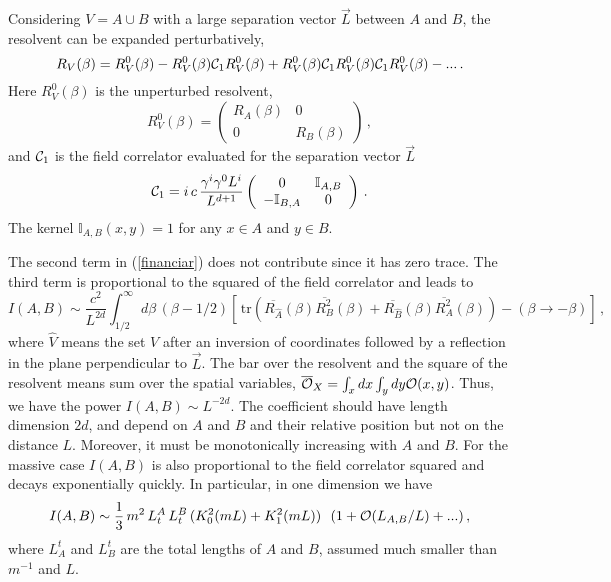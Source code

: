 \documentclass[a4paper]{article}
\begin{document}
Considering $V=A\cup B$ with a large separation vector $\vec{L}$ between $A$ and $B$, the resolvent can be expanded perturbatively,
\begin{equation}
R_V(\beta)=R_V^0(\beta)-R_V^0(\beta){\cal C}_1 R_V^0(\beta)+R_V^0(\beta){\cal C}_1 R_V^0(\beta){\cal C}_1 R_V^0(\beta)-...\,.
\label{financiar1}
\end{equation}
Here $R_V^0(\beta)$ is the unperturbed resolvent, 
\begin{equation}
R_V^0(\beta)=\left(\begin{array}{cc}
R_A(\beta) & 0 \\
0 & R_B(\beta) 
 \end{array}
\right)\,,
\end{equation}
and ${\cal C}_1$ is the field correlator evaluated for the separation vector $\vec{L}$ 
\begin{equation}
{\cal C}_1=i\,c \,\frac{\gamma^i \gamma^0 L^i}{L^{d+1}} \left(\begin{array}{cc}
0& {\mathbb I}_{A,B} \\
-{\mathbb I}_{B,A} & 0 
 \end{array}
\right)\,.
\end{equation}
The kernel ${\mathbb I}_{A,B}(x,y)=1$ for any $x\in A$ and $y\in B$. 




The second term in (\ref{financiar}) does not contribute since it has zero trace. The third term is proportional to the squared of the field correlator and leads to 
\begin{equation}
I(A,B)\sim \frac{c^2}{L^{2 d}}\int^\infty_{1/2} d\beta\,\left(\beta-1/2\right)\left[\, \textrm{tr} \left(  \overline{R_{\hat{A}}}(\beta) \overline{R_B^2}(\beta) +  \overline{R_{\hat{B}}}(\beta)  \overline{R_A^2}(\beta)\right)            -\left(\beta\rightarrow -\beta\right)\right]\,,\label{inn}
\end{equation}
where $\hat{V}$ means the set $V$ after an inversion of coordinates followed by a reflection in the plane perpendicular to $\vec{L}$. The bar over the resolvent and the square of the resolvent means sum over the spatial variables, $\overline{{\cal O}}_X=\int_x dx\int_y dy {\cal O}(x,y)$.
Thus, we have the power $I(A,B)\sim L^{-2d}$. The coefficient should have length dimension $2d$, and depend on $A$ and $B$ and their relative position but not on the distance $L$. Moreover, it must be monotonically increasing with $A$ and $B$. For the massive case $I(A,B)$ is also proportional to the field correlator squared and decays exponentially quickly. In particular, in one dimension we have \cite{futuro}
\begin{equation}
I(A,B)\sim \frac{1}{3} \,m^2 \,L^A_t\, L^B_t \,(K_0^2(m L)+ K_1^2(m L)) \,\,\,\,(1 + {\cal O} (L_{A,B}/L)+...)\,,  
\end{equation}
where $L_A^t$ and $L_B^t$ are the total lengths of $A$ and $B$, assumed much smaller than $m^{-1}$ and $L$.  
\end{document}
